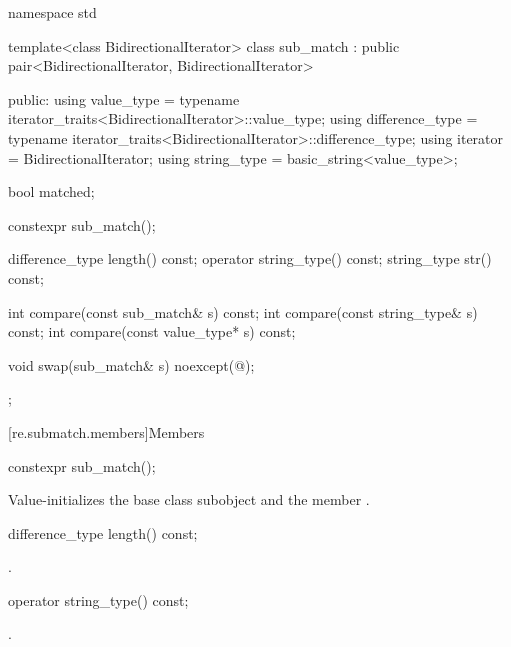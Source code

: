 \begin{codeblock}
namespace std {
  template<class BidirectionalIterator>
    class sub_match : public pair<BidirectionalIterator, BidirectionalIterator> {
    public:
      using value_type      =
              typename iterator_traits<BidirectionalIterator>::value_type;
      using difference_type =
              typename iterator_traits<BidirectionalIterator>::difference_type;
      using iterator        = BidirectionalIterator;
      using string_type     = basic_string<value_type>;

      bool matched;

      constexpr sub_match();

      difference_type length() const;
      operator string_type() const;
      string_type str() const;

      int compare(const sub_match& s) const;
      int compare(const string_type& s) const;
      int compare(const value_type* s) const;

      void swap(sub_match& s) noexcept(@\seebelow@);
    };
}
\end{codeblock}


[re.submatch.members]{Members}

%
\begin{itemdecl}
constexpr sub_match();
\end{itemdecl}

\begin{itemdescr}
\pnum
\effects
Value-initializes the  base class subobject and the member
.
\end{itemdescr}

%
\begin{itemdecl}
difference_type length() const;
\end{itemdecl}

\begin{itemdescr}
\pnum
\returns
{}.
\end{itemdescr}

%
\begin{itemdecl}
operator string_type() const;
\end{itemdecl}

\begin{itemdescr}
\pnum
\returns
{}.
\end{itemdescr}

